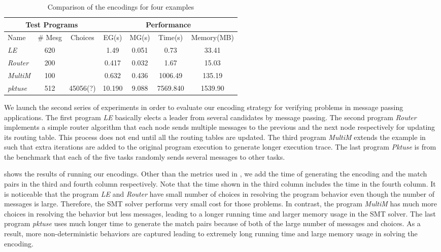 \begin{table}
\begin{center}
\setlength{\tabcolsep}{2pt}
\scriptsize
\begin{tabular}{|l|c|c|c|c|c|c|}
		\hline
         \multicolumn{3}{|c||}{Test Programs} & \multicolumn{4}{|c|}{Performance} \\ \hline
         Name & \# Mesg & Choices & EG(s) & MG(s) & Time(s) & Memory(MB) \\ \hline
         \textit{LE} & 620 & & 1.49 & 0.051 & 0.73 & 33.41  \\
         \textit{Router} & 200 & & 0.417 & 0.032 & 1.67 & 15.03  \\
         \textit{MultiM} & 100 &  & 0.632 & 0.436 &  1006.49 & 135.19  \\
         \textit{pktuse} & 512 & 45056(?) & 10.190 & 9.088 & 7569.840 & 1539.90 \\
         \hline
		\end{tabular}
\end{center}
\caption{Comparison of the encodings for four examples}
\label{table:second}
\end{table}
We launch the second series of experiments in order to evaluate our encoding strategy for verifying problems in message passing applications. The first program \textit{LE} basically elects a leader from several candidates by message passing. The second program \textit{Router} implements a simple router algorithm that each node sends multiple messages to the previous and the next node respectively for updating its routing table. This process does not end until all the routing tables are updated. The third program \textit{MultiM} extends the example in  such that extra iterations are added to the original program execution to generate longer execution trace. The last program \textit{Pktuse} is from the benchmark \cite{mpptest_benchmark} that each of the five tasks randomly sends several messages to other tasks.

 shows the results of running our encodings. Other than the metrics used in , we add the time of generating the encoding and the match pairs in the third and fourth column respectively. Note that the time shown in the third column includes the time in the fourth column. It is noticeable that the program \textit{LE} and \textit{Router} have small number of choices in resolving the program behavior even though the number of messages is large. Therefore, the SMT solver performs very small cost for those problems. In contrast, the program \textit{MultiM} has much more choices in resolving the behavior but less messages, leading to a longer running time and larger memory usage in the SMT solver. The last program \textit{pktuse} uses much longer time to generate the match pairs because of both of the large number of messages and choices. As a result, more non-deterministic behaviors are captured leading to extremely long running time and large memory usage in solving the encoding.

